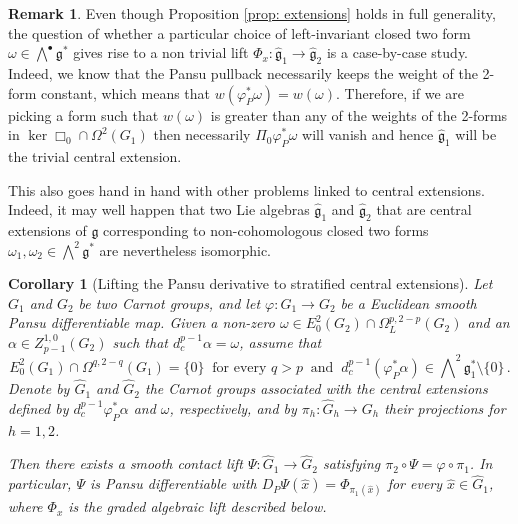 \documentclass[dvipsnames]{amsart}
\newtheorem{corollary}[theorem]{Corollary}
\theoremstyle{definition}
\newtheorem{remark}[theorem]{Remark}
\theoremstyle{definition}
\numberwithin{equation}{section}
\begin{document}
\begin{remark}
    Even though Proposition \ref{prop: extensions} holds in full generality, the question of whether a particular choice of left-invariant closed two form $\omega\in\bigwedge^\bullet\mathfrak{g}^\ast$ gives rise to a non trivial lift $\Phi_x\colon\hat{\mathfrak{g}}_1\to\hat{\mathfrak{g}}_2$ is a case-by-case study. Indeed, we know that the Pansu pullback necessarily keeps the weight of the 2-form constant, which means that $w(\varphi_P^\ast\omega)=w(\omega)$. Therefore, if we are picking a form such that $w(\omega)$ is greater than any of the weights of the 2-forms in $\ker\Box_0\cap\Omega^{2}(G_1)$ then necessarily $\Pi_0\varphi_P^\ast\omega$ will vanish and hence $\hat{\mathfrak{g}}_1$ will be the trivial central extension.

    This also goes hand in hand with other problems linked to central extensions. Indeed, it may well happen that two Lie algebras $\hat{\mathfrak{g}}_1$ and $\hat{\mathfrak{g}}_2$ that are central extensions of $\mathfrak{g}$ corresponding to non-cohomologous closed two forms $\omega_1,\omega_2\in\bigwedge^2\mathfrak{g}^\ast$ are nevertheless isomorphic.   
\end{remark}
\begin{corollary}[Lifting the Pansu derivative to stratified
central extensions]
\label{cor: extensions to stratifiable}
Let $G_1$ and $G_2$ be two Carnot groups, and let
$\varphi:G_1\to G_2$ be a Euclidean smooth Pansu
differentiable map.
Given a non-zero $\omega\in
    E_0^2(G_2)\cap\Omega_L^{p,2-p}(G_2)$ and an $\alpha\in Z_{p-1}^{1,0}(G_2)$ such that $d_c^{p-1}\alpha=\omega$, assume that
    $$E_0^2(G_1)\cap\Omega^{q,2-q}(G_1)=\{0\}
    \ \text{ for every }q>p\ \text{ and }\ d_c^{p-1}(\varphi_P^*\alpha)
    \in\bigwedge\nolimits^2\mathfrak{g}_1^\ast\setminus\{0\}\,.$$
Denote by $\hat G_1$ and $\hat G_2$ the Carnot groups
associated with the central extensions defined by
$d_c^{p-1}\varphi^\ast_P\alpha$ and $\omega$, respectively, and by
$\pi_h:\hat G_h\to G_h$ their projections for $h=1,2$.

Then there exists a smooth contact lift
$\Psi:\hat G_1\to\hat G_2$ satisfying $\pi_2\circ\Psi=\varphi\circ\pi_1$.
In particular, $\Psi$ is Pansu differentiable with $D_P\Psi(\hat x)=\Phi_{\pi_1(\hat x)}$ for every $\hat x\in\hat G_1$,
where $\Phi_x$ is the graded algebraic lift described below.
\end{corollary}
\end{document}
